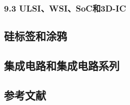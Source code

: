 \subsubsection{9.3 ULSI、WSI、SoC和3D-IC}



\subsection{硅标签和涂鸦}



\subsection{集成电路和集成电路系列}



\subsection{参考文献}